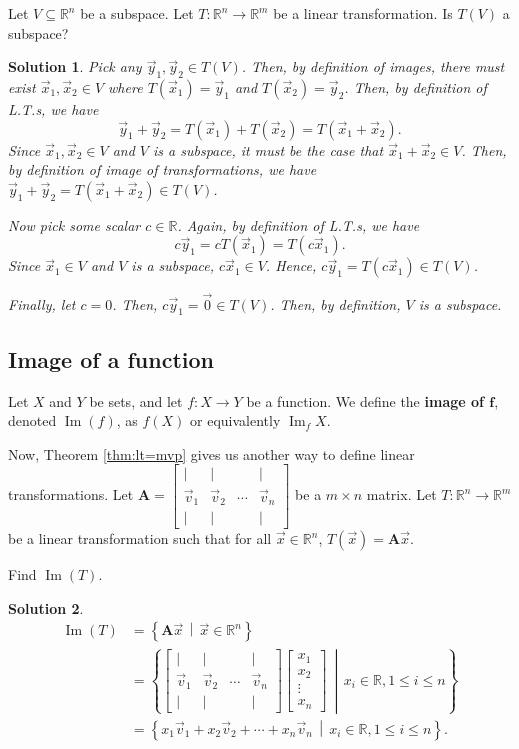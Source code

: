 \documentclass[]{book}
\DeclareMathOperator{\image}{Im}
\newcommand{\vecxxdx}[1][x]{\ensuremath{\begin{bmatrix}
#1_1 \\
#1_2 \\
\vdots \\
#1_n
\end{bmatrix}}}
\newcommand{\vecn}[1]{\ensuremath{\vec{v}_{#1}}}
\newcommand{\suchthat}{\,\middle|\,}
\newcommand{\mat}[1]{\ensuremath{\mathbf{#1}}}
\newcommand{\cmat}[1][v]{\begin{bmatrix}
        \vert & \vert & & \vert \\
        \vec{#1}_1 & \vec{#1}_2 & \cdots & \vec{#1}_n \\
        \vert & \vert & & \vert
    \end{bmatrix}
}
\newcommand{\R}{\ensuremath{\mathbb{R}}}
\newtheorem*{solution}{Solution}
\begin{document}
\begin{example}
    Let $V \subseteq \R^n$ be a subspace. Let $T:\R^n \to \R^m$ be a linear transformation. Is $T(V)$ a subspace?
\begin{solution}
    Pick any $\vec{y}_1, \vec{y}_2 \in T(V)$. Then, by definition of images, there must exist $\vec{x}_1,\vec{x}_2 \in V$ where $T(\vec{x}_1)=\vec{y}_1$ and $T(\vec{x}_2)=\vec{y}_2$.
    Then, by definition of L.T.s, we have
    \[\vec{y}_1 + \vec{y}_2 = T(\vec{x}_1) + T(\vec{x}_2) = T(\vec{x}_1 + \vec{x}_2).\]
    Since $\vec{x}_1,\vec{x}_2 \in V$ and $V$ is a subspace, it must be the case that $\vec{x}_1 + \vec{x}_2 \in V$. Then, by definition of image of transformations, we have $\vec{y}_1 + \vec{y}_2 = T(\vec{x}_1 + \vec{x}_2) \in T(V)$.
    
    Now pick some scalar $c \in \R$. Again, by definition of L.T.s, we have
    \[c\vec{y}_1 = cT(\vec{x}_1) = T(c\vec{x}_1).\]
    Since $\vec{x}_1 \in V$ and $V$ is a subspace, $c\vec{x}_1 \in V$. Hence, $c\vec{y}_1 = T(c\vec{x}_1) \in T(V)$. 
    
    Finally, let $c=0$. Then, $c\vec{y}_1 = \vec{0} \in T(V)$. Then, by definition, $V$ is a subspace. \hfill \qedsymbol
\end{solution}
\end{example}

\subsection{Image of a function}

\begin{definition}
    \label{defn: image of function}
    Let $X$ and $Y$ be sets, and let $f:X \to Y$ be a function. We define the \textbf{image of $\pmb{f}$}, denoted $\image(f)$, as $f(X)$ or equivalently $\image_{f}{X}$.
\end{definition}

Now, Theorem \ref{thm:lt=mvp} gives us another way to define linear transformations. Let $\mat{A} = \cmat$ be a $m \times n$ matrix. Let $T:\R^n \to \R^m$ be a linear transformation such that for all $\vec{x} \in \R^n$, $T(\vec{x}) = \mat{A} \vec{x}$. \begin{example}
    \label{expl: find image of transformation}
    Find $\image(T)$.
\begin{solution}
    \begin{align*}
        \image(T) &= \left\{\mat{A}\vec{x} \suchthat \vec{x} \in \R^n\right\} \\
        &= \left\{\cmat \vecxxdx \suchthat x_i \in \R, 1 \leq i \leq n\right\} \\
        &= \left\{x_1\vecn{1} + x_2\vecn{2} + \cdots + x_n\vecn{n} \suchthat x_i \in \R, 1 \leq i \leq n\right\}.
    \end{align*}
    \hfill \qedsymbol
\end{solution}
\end{example}
\end{document}
